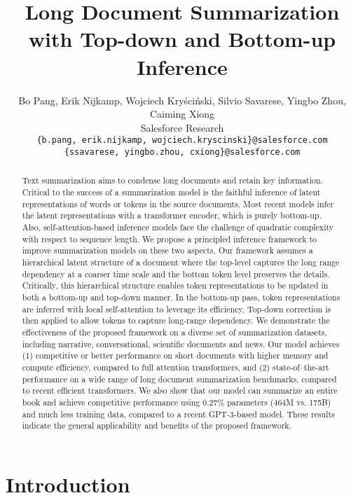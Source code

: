 \documentclass{article} \usepackage{iclr2022_conference,times}
\title{Long Document Summarization with Top-down and Bottom-up Inference}
\author{Bo Pang, Erik Nijkamp, Wojciech Kryściński, Silvio Savarese, Yingbo Zhou, Caiming Xiong  \\
Salesforce Research\\
\texttt{\{b.pang, erik.nijkamp, wojciech.kryscinski\}@salesforce.com}\\
\texttt{\{ssavarese, yingbo.zhou, cxiong\}@salesforce.com} 
}
\begin{document}
\maketitle

\begin{abstract}
Text summarization aims to condense long documents and retain key information. Critical to the success of a summarization model is the faithful inference of latent representations of words or tokens in the source documents. Most recent models infer the latent representations with a transformer encoder, which is purely bottom-up. Also, self-attention-based inference models face the challenge of quadratic complexity with respect to sequence length. We propose a principled inference framework to improve summarization models on these two aspects. Our framework assumes a hierarchical latent structure of a document where the top-level captures the long range dependency at a coarser time scale and the bottom token level preserves the details. Critically, this hierarchical structure enables token representations to be updated in both a bottom-up and top-down manner. In the bottom-up pass, token representations are inferred with local self-attention to leverage its efficiency. Top-down correction is then applied to allow tokens to capture long-range dependency. We demonstrate the effectiveness of the proposed framework on a diverse set of summarization datasets, including narrative, conversational, scientific documents and news. Our model achieves (1) competitive or better performance on short documents with higher memory and compute efficiency, compared to full attention transformers, and (2) state-of--the-art performance on a wide range of long document summarization benchmarks, compared to recent efficient transformers. We also show that our model can summarize an entire book and achieve competitive performance using $0.27\%$ parameters (464M vs. 175B) and much less training data, compared to a recent GPT-3-based model. These results indicate the general applicability and benefits of the proposed framework. 
\end{abstract}

\section{Introduction}
\end{document}
